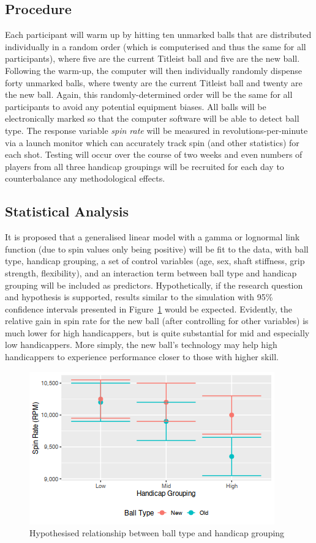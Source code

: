 \documentclass{article}
\begin{document}
\subsection*{Procedure}

Each participant will warm up by hitting ten unmarked balls that are distributed individually in a random order (which is computerised and thus the same for all participants), where five are the current Titleist ball and five are the new ball. 
Following the warm-up, the computer will then individually randomly dispense forty unmarked balls, where twenty are the current Titleist ball and twenty are the new ball. 
Again, this randomly-determined order will be the same for all participants to avoid any potential equipment biases.
All balls will be electronically marked so that the computer software will be able to detect ball type. 
The response variable \textit{spin rate} will be measured in revolutions-per-minute via a launch monitor which can accurately track spin (and other statistics) for each shot. 
Testing will occur over the course of two weeks and even numbers of players from all three handicap groupings will be recruited for each day to counterbalance any methodological effects.

\subsection*{Statistical Analysis}

It is proposed that a generalised linear model with a gamma or lognormal link function (due to spin values only being positive) will be fit to the data, with ball type, handicap grouping, a set of control variables (age, sex, shaft stiffness, grip strength, flexibility), and an interaction term between ball type and handicap grouping will be included as predictors. 
Hypothetically, if the research question and hypothesis is supported, results similar to the simulation with 95\% confidence intervals presented in Figure~\ref{fig:expectations} would be expected.
Evidently, the relative gain in spin rate for the new ball (after controlling for other variables) is much lower for high handicappers, but is quite substantial for mid and especially low handicappers. 
More simply, the new ball's technology may help high handicappers to experience performance closer to those with higher skill.

\begin{figure}[h]
    \centering
    \includegraphics[max width=\linewidth, scale=0.53]{expectations}
    \caption{\label{fig:expectations}Hypothesised relationship between ball type and handicap grouping}
\end{figure}
\end{document}
